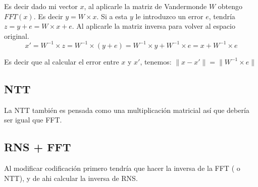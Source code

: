 \documentclass[12pt, oneside]{article}
\begin{document}
Es decir dado mi vector $x$, al aplicarle la matriz de Vandermonde $W$ obtengo $FFT(x)$.
Es decir $ y = W \times x$.
Si a esta $y$ le introduzco un error $e$, tendría $z = y + e = W\times x + e$.
Al aplicarle la matriz inversa para volver al espacio original.
\begin{equation*}
    x' = W^{-1}\times z = W^{-1}\times (y+e) = W^{-1}\times y + W^{-1}\times e = x + W^{-1}\times e
\end{equation*}

Es decir que al calcular el error entre $x$ y $x'$, tenemos:
$\lVert x-x' \rVert = \lVert W^{-1} \times e \rVert$

\subsection {NTT}
La NTT también es pensada como una multiplicación matricial así que debería  ser igual que FFT.

\subsection{RNS + FFT}
Al modificar codificación primero tendría que hacer la inversa de la FFT ( o NTT), y de ahi calcular la
inversa de RNS.
\end{document}
